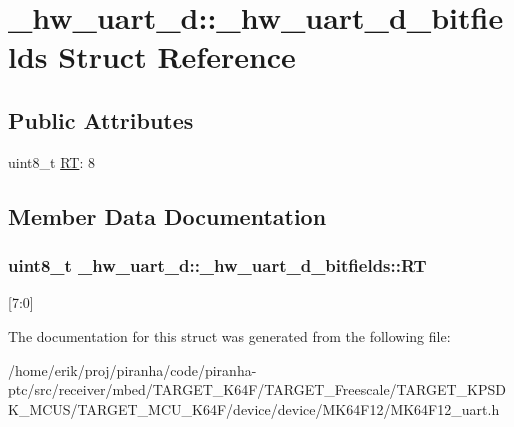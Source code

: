 \hypertarget{struct__hw__uart__d_1_1__hw__uart__d__bitfields}{}\section{\+\_\+hw\+\_\+uart\+\_\+d\+:\+:\+\_\+hw\+\_\+uart\+\_\+d\+\_\+bitfields Struct Reference}
\label{struct__hw__uart__d_1_1__hw__uart__d__bitfields}
\subsection*{Public Attributes}
\begin{DoxyCompactItemize}
\item 
uint8\+\_\+t \hyperlink{struct__hw__uart__d_1_1__hw__uart__d__bitfields_a99bfecac687ff279747778e588879c1f}{RT}\+: 8
\end{DoxyCompactItemize}


\subsection{Member Data Documentation}
\subsubsection[{\texorpdfstring{RT}{RT}}]{\setlength{\rightskip}{0pt plus 5cm}uint8\+\_\+t \+\_\+hw\+\_\+uart\+\_\+d\+::\+\_\+hw\+\_\+uart\+\_\+d\+\_\+bitfields\+::\+RT}\hypertarget{struct__hw__uart__d_1_1__hw__uart__d__bitfields_a99bfecac687ff279747778e588879c1f}{}\label{struct__hw__uart__d_1_1__hw__uart__d__bitfields_a99bfecac687ff279747778e588879c1f}
\mbox{[}7\+:0\mbox{]} 

The documentation for this struct was generated from the following file\+:\begin{DoxyCompactItemize}
\item 
/home/erik/proj/piranha/code/piranha-\/ptc/src/receiver/mbed/\+T\+A\+R\+G\+E\+T\+\_\+\+K64\+F/\+T\+A\+R\+G\+E\+T\+\_\+\+Freescale/\+T\+A\+R\+G\+E\+T\+\_\+\+K\+P\+S\+D\+K\+\_\+\+M\+C\+U\+S/\+T\+A\+R\+G\+E\+T\+\_\+\+M\+C\+U\+\_\+\+K64\+F/device/device/\+M\+K64\+F12/M\+K64\+F12\+\_\+uart.\+h\end{DoxyCompactItemize}
